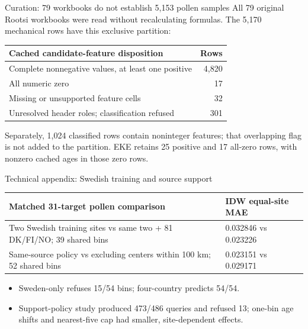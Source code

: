\begin{frame}{Curation: 79 workbooks do not establish 5,153 pollen samples}
\small
All 79 original Rootsi workbooks were read without recalculating formulas.
The 5,170 mechanical rows have this exclusive partition:
\begin{center}
\begin{tabular}{lr}
\toprule
Cached candidate-feature disposition & Rows \\
\midrule
Complete nonnegative values, at least one positive & 4,820 \\
All numeric zero & 17 \\
Missing or unsupported feature cells & 32 \\
Unresolved header roles; classification refused & 301 \\
\bottomrule
\end{tabular}
\end{center}
Separately, 1,024 classified rows contain noninteger features; that overlapping
flag is not added to the partition. EKE retains 25 positive and 17 all-zero
rows, with nonzero cached ages in those zero rows.
\end{frame}

\begin{frame}{Technical appendix: Swedish training and source support}
\small
\begin{tabular}{p{}p{}}
\toprule
Matched 31-target pollen comparison & IDW equal-site MAE \\
\midrule
Two Swedish training sites vs same two + 81 DK/FI/NO; 39 shared bins & 0.032846 vs 0.023226 \\
Same-source policy vs excluding centers within 100 km; 52 shared bins & 0.023151 vs 0.029171 \\
\bottomrule
\end{tabular}
\begin{itemize}
\item Sweden-only refuses 15/54 bins; four-country predicts 54/54.
\item Support-policy study produced 473/486 queries and refused 13; one-bin age shifts and nearest-five cap had smaller, site-dependent effects.
\end{itemize}
\end{frame}

